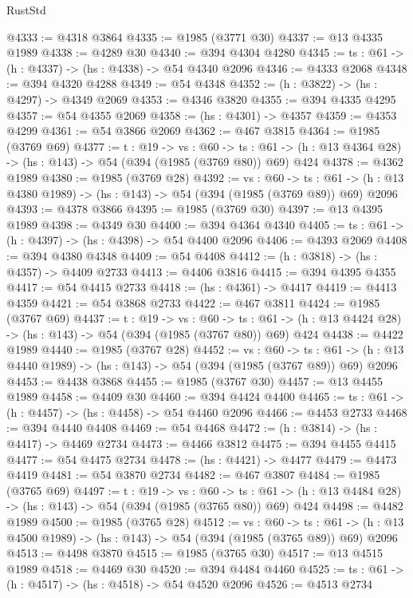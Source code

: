 \begin{lexlean}{RustStd}
\begin{coremodule}
{\begin{coremodule}
{{{{{{{{{{@4333 := @4318 @3864
@4335 := @1985 (@3771 @30)
@4337 := @13 @4335 @1989
@4338 := @4289 @30
@4340 := @394 @4304 @4280
@4345 := {ts : @61} -> (h : @4337) -> (hs : @4338) -> @54 @4340 @2096
@4346 := @4333 @2068
@4348 := @394 @4320 @4288
@4349 := @54 @4348
@4352 := (h : @3822) -> (hs : @4297) -> @4349 @2069
@4353 := @4346 @3820
@4355 := @394 @4335 @4295
@4357 := @54 @4355 @2069
@4358 := (hs : @4301) -> @4357
@4359 := @4353 @4299
@4361 := @54 @3866 @2069
@4362 := @467 @3815
@4364 := @1985 (@3769 @69)
@4377 := {t : @19} ->
  {vs : @60} ->
  {ts : @61} -> (h : @13 @4364 @28) -> (hs : @143) -> @54 (@394 (@1985 (@3769 @80)) @69) @424
@4378 := @4362 @1989
@4380 := @1985 (@3769 @28)
@4392 := {vs : @60} ->
  {ts : @61} -> (h : @13 @4380 @1989) -> (hs : @143) -> @54 (@394 (@1985 (@3769 @89)) @69) @2096
@4393 := @4378 @3866
@4395 := @1985 (@3769 @30)
@4397 := @13 @4395 @1989
@4398 := @4349 @30
@4400 := @394 @4364 @4340
@4405 := {ts : @61} -> (h : @4397) -> (hs : @4398) -> @54 @4400 @2096
@4406 := @4393 @2069
@4408 := @394 @4380 @4348
@4409 := @54 @4408
@4412 := (h : @3818) -> (hs : @4357) -> @4409 @2733
@4413 := @4406 @3816
@4415 := @394 @4395 @4355
@4417 := @54 @4415 @2733
@4418 := (hs : @4361) -> @4417
@4419 := @4413 @4359
@4421 := @54 @3868 @2733
@4422 := @467 @3811
@4424 := @1985 (@3767 @69)
@4437 := {t : @19} ->
  {vs : @60} ->
  {ts : @61} -> (h : @13 @4424 @28) -> (hs : @143) -> @54 (@394 (@1985 (@3767 @80)) @69) @424
@4438 := @4422 @1989
@4440 := @1985 (@3767 @28)
@4452 := {vs : @60} ->
  {ts : @61} -> (h : @13 @4440 @1989) -> (hs : @143) -> @54 (@394 (@1985 (@3767 @89)) @69) @2096
@4453 := @4438 @3868
@4455 := @1985 (@3767 @30)
@4457 := @13 @4455 @1989
@4458 := @4409 @30
@4460 := @394 @4424 @4400
@4465 := {ts : @61} -> (h : @4457) -> (hs : @4458) -> @54 @4460 @2096
@4466 := @4453 @2733
@4468 := @394 @4440 @4408
@4469 := @54 @4468
@4472 := (h : @3814) -> (hs : @4417) -> @4469 @2734
@4473 := @4466 @3812
@4475 := @394 @4455 @4415
@4477 := @54 @4475 @2734
@4478 := (hs : @4421) -> @4477
@4479 := @4473 @4419
@4481 := @54 @3870 @2734
@4482 := @467 @3807
@4484 := @1985 (@3765 @69)
@4497 := {t : @19} ->
  {vs : @60} ->
  {ts : @61} -> (h : @13 @4484 @28) -> (hs : @143) -> @54 (@394 (@1985 (@3765 @80)) @69) @424
@4498 := @4482 @1989
@4500 := @1985 (@3765 @28)
@4512 := {vs : @60} ->
  {ts : @61} -> (h : @13 @4500 @1989) -> (hs : @143) -> @54 (@394 (@1985 (@3765 @89)) @69) @2096
@4513 := @4498 @3870
@4515 := @1985 (@3765 @30)
@4517 := @13 @4515 @1989
@4518 := @4469 @30
@4520 := @394 @4484 @4460
@4525 := {ts : @61} -> (h : @4517) -> (hs : @4518) -> @54 @4520 @2096
@4526 := @4513 @2734
}}}}}}}}}}
\end{coremodule}}
\end{coremodule}
\end{lexlean}
